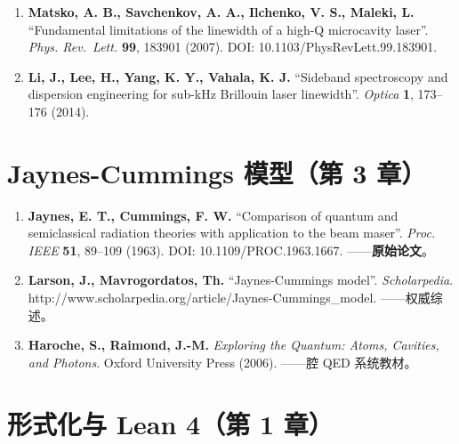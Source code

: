 \documentclass[
  11pt,
  a4paper,
]{ctexrep}
\begin{document}

\begin{enumerate}
\def\labelenumi{\arabic{enumi}.}
\setcounter{enumi}{7}
\item
  \textbf{Matsko, A. B., Savchenkov, A. A., Ilchenko, V. S., Maleki, L.}
  ``Fundamental limitations of the linewidth of a high-Q microcavity
  laser''. \emph{Phys. Rev.~Lett.} \textbf{99}, 183901 (2007). DOI:
  10.1103/PhysRevLett.99.183901.
\item
  \textbf{Li, J., Lee, H., Yang, K. Y., Vahala, K. J.} ``Sideband
  spectroscopy and dispersion engineering for sub-kHz Brillouin laser
  linewidth''. \emph{Optica} \textbf{1}, 173--176 (2014).
\end{enumerate}

\section*{Jaynes-Cummings 模型（第 3
章）}\label{jaynes-cummings-ux6a21ux578bux7b2c-3-ux7ae0}


\begin{enumerate}
\def\labelenumi{\arabic{enumi}.}
\setcounter{enumi}{9}
\item
  \textbf{Jaynes, E. T., Cummings, F. W.} ``Comparison of quantum and
  semiclassical radiation theories with application to the beam maser''.
  \emph{Proc. IEEE} \textbf{51}, 89--109 (1963). DOI:
  10.1109/PROC.1963.1667. ------\textbf{原始论文}。
\item
  \textbf{Larson, J., Mavrogordatos, Th.} ``Jaynes-Cummings model''.
  \emph{Scholarpedia}.
  http://www.scholarpedia.org/article/Jaynes-Cummings\_model.
  ------权威综述。
\item
  \textbf{Haroche, S., Raimond, J.-M.} \emph{Exploring the Quantum:
  Atoms, Cavities, and Photons}. Oxford University Press (2006).
  ------腔 QED 系统教材。
\end{enumerate}

\section*{形式化与 Lean 4（第 1
章）}\label{ux5f62ux5f0fux5316ux4e0e-lean-4ux7b2c-1-ux7ae0}

\end{document}
